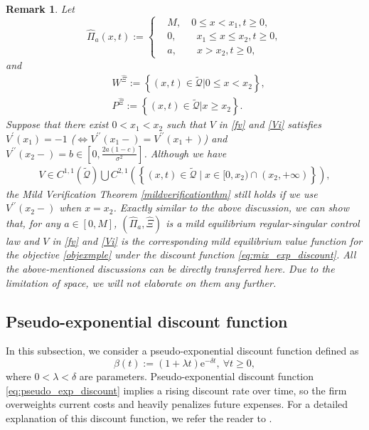 \documentclass[11pt,reqno]{article}%
\newtheorem{remark}[theorem]{Remark}
\numberwithin{equation}{section}
\begin{document}
\begin{remark}
Let 
\begin{equation}\nonumber
\hat \Pi_a(x,t) := \left\{\begin{aligned}
& M,\quad  0 \le x < x_1, t\ge0,\\
& 0, \qquad x_1\leq x \leq x_2, t\ge 0,\\
& a, \qquad x > x_2, t\ge 0,
\end{aligned}\right.
\end{equation}
and
\begin{equation}
\begin{aligned}
&W^{\hat{\Xi}}:=\left\{(x,t)\in\mathcal{\tilde{Q}}|0\leq x< x_2\right\},\\
&P^{\hat{\Xi}}:=\left\{(x,t)\in\mathcal{\tilde{Q}}|x\ge x_2\right\}.
\end{aligned}\nonumber
\end{equation}
Suppose that there exist $0<x_1<x_2$ such that $V$ in \eqref{fv} and \eqref{Vi} satisfies $V^\prime(x_1) = -1$
 ($\Leftrightarrow V^{\prime\prime}(x_1-)=V^{\prime\prime}(x_1+)$) and $V^{\prime\prime}(x_2-) = b\in[0,\frac{2a(1-c)}{\sigma^2}]$.
 Although we have
 \begin{equation}
\begin{aligned}V\in C^{1,1}\left(\mathcal{\tilde{Q}}\right)\bigcup C^{2,1}\left(\left\{(x,t)\in\mathcal{\tilde{Q}}\mid x\in[0,x_2)\cap(x_2,+\infty)\right\}\right),\end{aligned}\nonumber
\end{equation}
the Mild Verification Theorem \ref{mildverificationthm} still holds if we use $V^{\prime\prime}(x_2-)$ when $x=x_2$. Exactly similar to the above discussion, we can show that, for any $a\in[0,M]$, $\left(\hat\Pi_a,\hat\Xi\right)$ is a mild equilibrium regular-singular control law and $V$ in \eqref{fv} and \eqref{Vi} is the corresponding mild equilibrium value function for the objective \eqref{objexmple} under the discount function \eqref{eq:mix_exp_discount}. All the above-mentioned discussions can be directly transferred here. Due to the limitation of space, we will not elaborate on them any further.
\end{remark}






\subsection{Pseudo-exponential discount function}
In this subsection, we consider a pseudo-exponential discount function defined as
\begin{equation}\label{eq:pseudo_exp_discount}
\beta(t) := (1+\lambda t) \mathrm{e}^{-\delta t},\  \forall t\ge 0,
\end{equation}
where $0<\lambda< \delta$ are parameters. Pseudo-exponential discount function \eqref{eq:pseudo_exp_discount} implies a rising discount rate over time, so the firm overweights current costs and heavily penalizes future expenses. For a detailed explanation of this discount function, we refer the reader to \citet{ekeland2008invest}. 
\end{document}
